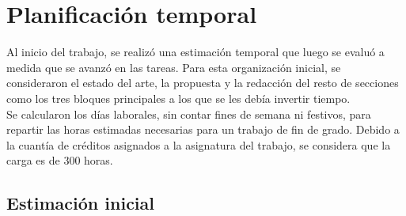\section{Planificación temporal}
Al inicio del trabajo, se realizó una estimación temporal que luego se evaluó a medida que se avanzó en las tareas. Para esta organización inicial, se consideraron el estado del arte, la propuesta y la redacción del resto de secciones como los tres bloques principales a los que se les debía invertir tiempo.\\

Se calcularon los días laborales, sin contar fines de semana ni festivos, para repartir las horas estimadas necesarias para un trabajo de fin de grado. Debido a la cuantía de créditos asignados a la asignatura del trabajo, se considera que la carga es de 300 horas.


\subsection{Estimación inicial}

